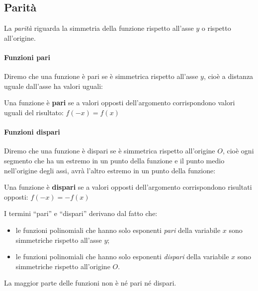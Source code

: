 \pagebreak %

\subsection{Parità}

La \emph{parità} riguarda la simmetria della funzione rispetto all'asse 
\(y\) o rispetto all'origine.

\paragraph{Funzioni pari}
Diremo che una funzione è pari se è simmetrica rispetto all'asse \(y\), 
cioè a distanza uguale dall'asse ha valori uguali:

\begin{definizione}
Una funzione è \textbf{pari} se a valori opposti dell'argomento 
corrispondono valori uguali del risultato: \quad 
\(f(-x) = f(x)\)
\end{definizione}

\paragraph{Funzioni dispari}
Diremo che una funzione è dispari se è simmetrica rispetto all'origine \(O\), 
cioè ogni segmento che ha un estremo in un punto della funzione e il punto 
medio nell'origine degli assi, avrà l'altro estremo in un punto della funzione:

\begin{definizione}
Una funzione è \textbf{dispari} se a valori opposti dell'argomento 
corrispondono risultati opposti: \quad 
\(f(-x) = -f(x)\)
\end{definizione}

I termini ``pari'' e ``dispari'' derivano dal fatto che:
\begin{itemize} [nosep]
\item 
le funzioni polinomiali che hanno solo esponenti \emph{pari} della 
variabile \(x\) sono simmetriche rispetto all'asse \(y\);
\item 
le funzioni polinomiali che hanno solo esponenti \emph{dispari} della 
variabile \(x\) sono simmetriche rispetto all'origine \(O\).
\end{itemize}

\begin{osservazione}
La maggior parte delle funzioni non è né pari né dispari.
\end{osservazione}

